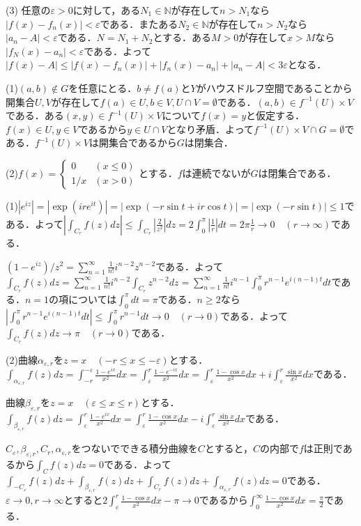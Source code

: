 \documentclass[
		book,
		head_space=20mm,
		foot_space=20mm,
		gutter=10mm,
		line_length=190mm
]{jlreq}
\begin{document}
(3)
任意の$\varepsilon>0$に対して，ある$N_1 \in \mathbb{N}$が存在して$n>N_1$なら$|f(x)-f_n(x)|<\varepsilon$である．またある$N_2 \in \mathbb{N}$が存在して$n>N_2$なら$|a_n-A|<\varepsilon$である．$N=N_1+N_2$とする．ある$M>0$が存在して$x>M$なら$|f_N(x)-a_n|<\varepsilon$である．よって$|f(x)-A|\le|f(x)-f_n(x)|+|f_n(x)-a_n|+|a_n-A|<3\varepsilon$となる．

(1)$(a,b)\notin G$を任意にとる．$b\neq f(a)$と$Y$がハウスドルフ空間であることから開集合$U,V$が存在して$f(a)\in U,b\in V,U\cap V=\emptyset$である．$(a,b)\in f^{-1}(U)\times V$である．ある$(x,y)\in f^{-1}(U)\times V$について$f(x)=y$と仮定する．$f(x)\in U,y\in V$であるから$y \in U\cap V$となり矛盾．よって$f^{-1}(U)\times V \cap G = \emptyset$である．$f^{-1}(U)\times V$は開集合であるから$G$は閉集合．

(2)$f(x)=\begin{cases}
    0 & (x\le 0) \\
    1/x & (x>0)
\end{cases}$とする．$f$は連続でないが$G$は閉集合である．

(1)$|e^{iz}|=|\exp({ire^{it}})|=|\exp(-r\sin t+ir\cos t)|=|\exp(-r\sin t)|\le 1$である．よって$|\int_{C_r} f(z)dz|\le \int_{C_r} |\frac{2}{z^2}|dz=2\int_0^{\pi} |\frac{1}{r}|dt=2\pi\frac{1}{r}\rightarrow 0 \quad(r\rightarrow \infty)$である．

$(1-e^{iz})/z^2=\sum\limits_{n=1}^\infty \frac{1}{n!}i^{n-2}z^{n-2}$である．よって$\int_{C_r} f(z)dz= \sum\limits_{n=1}^\infty \frac{1}{n!}i^{n-2}\int_{C_r}z^{n-2}dz=\sum\limits_{n=1}^\infty \frac{1}{n!}i^{n-1}\int_{0}^\pi r^{n-1}e^{i(n-1)t}dt$である．$n=1$の項については$\int_{0}^\pi dt=\pi$である．$n\ge 2$なら
$|\int_0^\pi r^{n-1}e^{i(n-1)t}dt|\le \int_0^\pi r^{n-1}dt\rightarrow0 \quad(r\to 0)$である．よって$\int_{C_r} f(z)dz\rightarrow \pi \quad(r\to 0)$である．

(2)曲線$\alpha_{\varepsilon,r}$を$z=x \quad(-r \le x \le -\varepsilon)$とする．
$\int_{\alpha_{\varepsilon,r}}f(z)dz=\int_{-r}^{-\varepsilon} \frac{1-e^{ix}}{x^2}dx=\int_{\varepsilon}^{r} \frac{1-e^{-ix}}{x^2}dx=\int_{\varepsilon}^{r} \frac{1-\cos x}{x^2}dx+i\int_{\varepsilon}^{r} \frac{\sin x}{x^2}dx$である．

曲線$\beta_{\varepsilon,r}$を$z=x \quad(\varepsilon \le x \le r)$とする．
$\int_{\beta_{\varepsilon,r}}f(z)dz=\int_{\varepsilon}^{r} \frac{1-e^{ix}}{x^2}dx=\int_{\varepsilon}^{r} \frac{1-\cos x}{x^2}dx-i\int_{\varepsilon}^{r} \frac{\sin x}{x^2}dx$である．

$C_{\varepsilon},\beta_{\varepsilon,r},C_r ,\alpha_{\varepsilon,r}$をつないでできる積分曲線を$C$とすると，$C$の内部で$f$は正則であるから$\int_C f(z)dz=0$である．よって$\int_{-C_{\varepsilon}}f(z)dz+\int_{\beta_{\varepsilon,r}}f(z)dz+\int_{C_r}f(z)dz+\int_{\alpha_{\varepsilon,r}}f(z)dz=0$である．
$\varepsilon \to 0,r\to \infty$とすると$2\int_{\varepsilon}^{r} \frac{1-\cos x}{x^2}dx-\pi \rightarrow 0$であるから$\int_{0}^\infty \frac{1-\cos x}{x^2}dx=\frac{\pi}{2}$である．
\end{document}
